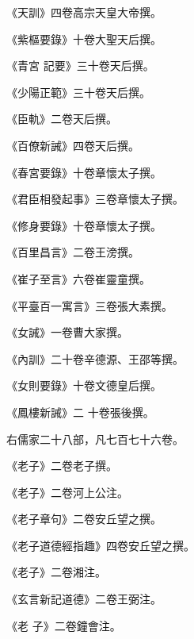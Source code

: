 \begin{pinyinscope}
 《天訓》四卷高宗天皇大帝撰。



 《紫樞要錄》十卷大聖天后撰。



 《青宮
 記要》三十卷天后撰。



 《少陽正範》三十卷天后撰。



 《臣軌》二卷天后撰。



 《百僚新誡》四卷天后撰。



 《春宮要錄》十卷章懷太子撰。



 《君臣相發起事》三卷章懷太子撰。



 《修身要錄》十卷章懷太子撰。



 《百里昌言》二卷王滂撰。



 《崔子至言》六卷崔靈童撰。



 《平臺百一寓言》三卷張大素撰。



 《女誡》一卷曹大家撰。



 《內訓》二十卷辛德源、王邵等撰。



 《女則要錄》十卷文德皇后撰。



 《鳳樓新誡》二
 十卷張後撰。



 右儒家二十八部，凡七百七十六卷。



 《老子》二卷老子撰。



 《老子》二卷河上公注。



 《老子章句》二卷安丘望之撰。



 《老子道德經指趣》四卷安丘望之撰。



 《老子》二卷湘注。



 《玄言新記道德》二卷王弼注。



 《老
 子》二卷鐘會注。




\end{pinyinscope}
